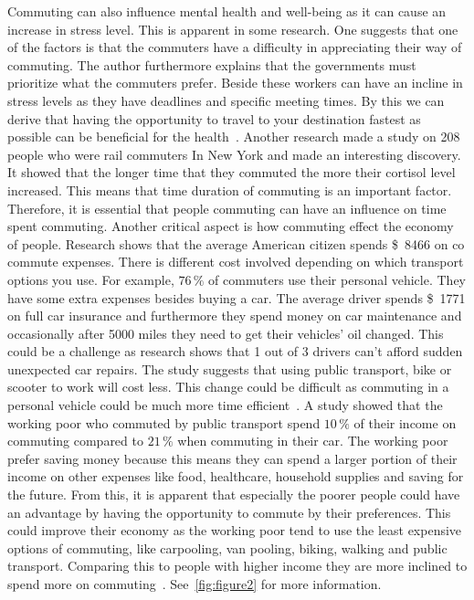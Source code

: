 Commuting can also influence mental health and well-being as it can cause an increase in stress level.
This is apparent in some research.
One suggests that one of the factors is that the commuters have a difficulty in appreciating their way of commuting.
The author furthermore explains that the governments must prioritize what the commuters prefer.
Beside these workers can have an incline in stress levels as they have deadlines and specific meeting times.
By this we can derive that having the opportunity to travel to your destination fastest as possible can be beneficial
for the health~\cite{koslowsky2013}.
Another research made a study on 208 people who were rail commuters In New York and made an interesting discovery.
It showed that the longer time that they commuted the more their cortisol level increased.
This means that time duration of commuting is an important factor.
Therefore, it is essential that people commuting can have an influence on time spent commuting.
Another critical aspect is how commuting effect the economy of people.
Research shows that the average American citizen spends \SI{8466}[\$]{} on co commute expenses.
There is different cost involved depending on which transport options you use.
For example, \(76\,\%\) of commuters use their personal vehicle.
They have some extra expenses besides buying a car.
The average driver spends \SI{1771}[\$]{} on full car insurance and furthermore they spend money on car maintenance
and occasionally after 5000 miles they need to get their vehicles' oil changed.
This could be a challenge as research shows that 1 out of 3 drivers can't afford sudden unexpected car repairs.
The study suggests that using public transport, bike or scooter to work will cost less.
This change could be difficult as commuting in a personal vehicle could be much more time efficient~\cite{bankrate2023}.
A study showed that the working poor who commuted by public transport spend \(10\,\%\) of their income on commuting
compared to \(21\,\%\) when commuting in their car.
The working poor prefer saving money because this means they can spend a larger portion of their income on other
expenses like food, healthcare, household supplies and saving for the future.
From this, it is apparent that especially the poorer people could have an advantage by having the opportunity to
commute by their preferences.
This could improve their economy as the working poor tend to use the least expensive options of commuting, like
carpooling, van pooling, biking, walking and public transport.
Comparing this to people with higher income they are more inclined to spend more on commuting~\cite{bankrate2023}.
See~\ref{fig:figure2} for more information.

